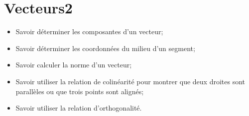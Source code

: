 \chapter{Vecteurs2}\label{ChVecteurs2}

\begin{acquis}
\begin{itemize}
\item Savoir déterminer les composantes d'un vecteur;
\item Savoir déterminer les coordonnées du milieu d'un segment;
\item Savoir calculer la norme d'un vecteur;
\item Savoir utiliser la relation de colinéarité pour montrer que deux droites sont parallèles ou que trois points sont alignés;
\item Savoir utiliser la relation d’orthogonalité.
\end{itemize}
\end{acquis}

\exercicesbase
\begin{colonne*exercice}

\end{colonne*exercice}

%

\pagebreak


